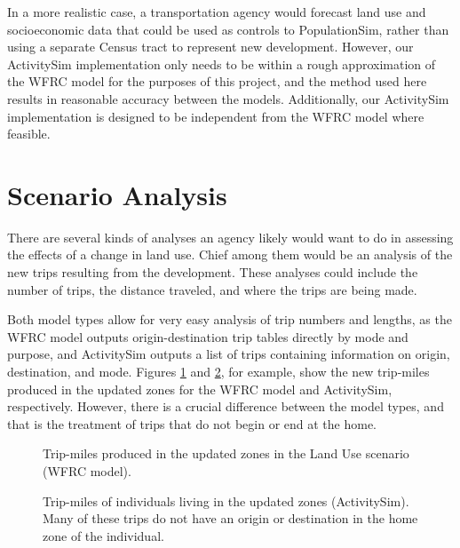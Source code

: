 \documentclass[fancy, oneside, mastersfancy, ms]{byuthesis}
\begin{document}
In a more realistic case, a transportation agency would forecast land
use and socioeconomic data that could be used as controls to
PopulationSim, rather than using a separate Census tract to represent
new development. However, our ActivitySim implementation only needs to
be within a rough approximation of the WFRC model for the purposes of
this project, and the method used here results in reasonable accuracy
between the models. Additionally, our ActivitySim implementation is
designed to be independent from the WFRC model where feasible.

\section{Scenario Analysis}\label{scenario-analysis}

There are several kinds of analyses an agency likely would want to do in
assessing the effects of a change in land use. Chief among them would be
an analysis of the new trips resulting from the development. These
analyses could include the number of trips, the distance traveled, and
where the trips are being made.

Both model types allow for very easy analysis of trip numbers and
lengths, as the WFRC model outputs origin-destination trip tables
directly by mode and purpose, and ActivitySim outputs a list of trips
containing information on origin, destination, and mode. Figures
\ref{fig-lu-personmiles-cube} and \ref{fig-lu-personmiles-asim}, for
example, show the new trip-miles produced in the updated zones for the
WFRC model and ActivitySim, respectively. However, there is a crucial
difference between the model types, and that is the treatment of trips
that do not begin or end at the home.

\begin{figure}


\caption{\label{fig-lu-personmiles-cube}Trip-miles produced in the
updated zones in the Land Use scenario (WFRC model).}

\end{figure}%

\begin{figure}


\caption[Trip-miles of individuals living in the updated zones
(ActivitySim).]{\label{fig-lu-personmiles-asim}Trip-miles of individuals
living in the updated zones (ActivitySim). Many of these trips do not
have an origin or destination in the home zone of the individual.}

\end{figure}%
\end{document}
